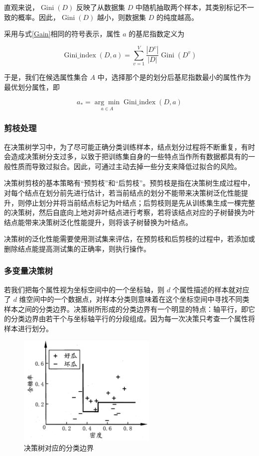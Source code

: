 \documentclass{ctexart}
\begin{document}
	直观来说，$\operatorname{Gini}(D)$ 反映了从数据集 $D$ 中随机抽取两个样本，其类别标记不一致的概率。因此，$\operatorname{Gini}(D)$ 越小，则数据集 $D$ 的纯度越高。
	
	采用与式\eqref{Gain}相同的符号表示，属性 $a$ 的基尼指数定义为
	
	\begin{equation}
		\operatorname{Gini\_index}(D, a)=\sum_{v=1}^{V} \frac{\left|D^{v}\right|}{|D|} \operatorname{Gini}\left(D^{v}\right)
	\end{equation}

	于是，我们在候选属性集合 $A$ 中，选择那个是的划分后基尼指数最小的属性作为最优划分属性，即 
	
	\begin{equation}
		a_\ast=\underset{a \in A}{\arg \min } \operatorname{Gini\_index}(D, a)
	\end{equation}
	
	\subsubsection{剪枝处理}
	
	在决策树学习中，为了尽可能正确分类训练样本，结点划分过程将不断重复，有时会造成决策树分支过多，以致于把训练集自身的一些特点当作所有数据都具有的一般性质而导致过拟合。因此，可通过主动去掉一些分支来降低过拟合的风险。
	
	决策树剪枝的基本策略有“预剪枝”和“后剪枝”。预剪枝是指在决策树生成过程中，对每个结点在划分前先进行估计，若当前结点的划分不能带来决策树泛化性能提升，则停止划分并将当前结点标记为叶结点；后剪枝则是先从训练集生成一棵完整的决策树，然后自底向上地对非叶结点进行考察，若将该结点对应的子树替换为叶结点能带来决策树泛化性能提升，则将该子树替换为叶结点。
	
	决策树的泛化性能需要使用测试集来评估，在预剪枝和后剪枝的过程中，若添加或删除结点能提高测试集的正确率，则执行操作。
	
	\subsubsection{多变量决策树}
	
	若我们把每个属性视为坐标空间中的一个坐标轴，则 $d$ 个属性描述的样本就对应了 $d$ 维空间中的一个数据点，对样本分类则意味着在这个坐标空间中寻找不同类样本之间的分类边界。决策树所形成的分类边界有一个明显的特点：轴平行，即它的分类边界由若干个与坐标轴平行的分段组成。因为每一次决策只考查一个属性将样本进行划分。
	
	\begin{figure}[!htb]
		\centering
		\label{决策树对应的分类边界}
		\includegraphics[scale=1,height=5.3cm]{../image/决策树对应的分类边界.png}
		\caption{决策树对应的分类边界}
	\end{figure}
	
\end{document}
